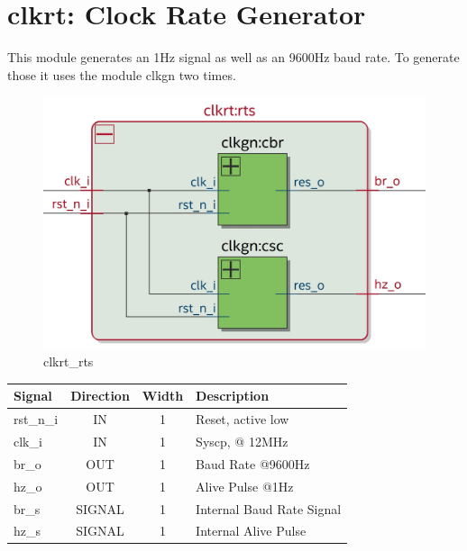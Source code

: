 \documentclass[12pt,a4 paper] {report}
\begin{document}
\section{clkrt: Clock Rate Generator}
This module generates an 1Hz signal as well as an 9600Hz baud rate. To generate those it uses the module clkgn two 
times.
\begin{figure}[h]
	\centering
	\includegraphics[scale=0.15]{../png/clkrt_rts.png}
	\caption{clkrt\_rts}
\end{figure}
\begin{center}
	\begin{tabular}{ | p{2cm} | c | c | p{5cm} |}
		\hline
		\textbf{Signal} & \textbf{Direction} & \textbf{Width} & \textbf{Description} \\
		\hline	
		rst\_n\_i & IN & 1 & Reset, active low \\
		\hline
		clk\_i & IN & 1 & Syscp, @ 12MHz \\
		\hline
		br\_o & OUT & 1 & Baud Rate @9600Hz \\
		\hline
		hz\_o & OUT & 1 & Alive Pulse @1Hz \\
		\hline
		\hline
		br\_s & SIGNAL & 1 & Internal Baud Rate Signal \\
		\hline	
		hz\_s & SIGNAL & 1 & Internal Alive Pulse \\
		\hline	
	\end{tabular}
\end{center}

\newpage
\end{document}

